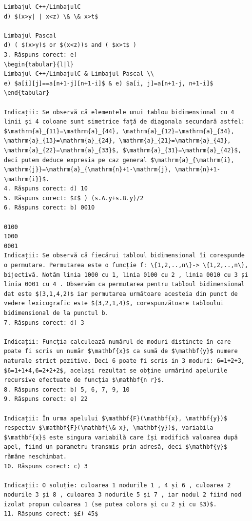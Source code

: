 \documentclass[10pt]{article}
\begin{document}
\begin{verbatim}
Limbajul C++/LimbajulC
d) $(x>y| | x<z) \& \& x>t$

Limbajul Pascal
d) ( $(x>y)$ or $(x<z))$ and ( $x>t$ )
3. Răspuns corect: e)
\begin{tabular}{l|l} 
Limbajul C++/LimbajulC & Limbajul Pascal \\
e) $a[i][j]==a[n+1-j][n+1-i]$ & e) $a[i, j]=a[n+1-j, n+1-i]$
\end{tabular}

Indicații: Se observă că elementele unui tablou bidimensional cu 4 linii și 4 coloane sunt simetrice față de diagonala secundară astfel: $\mathrm{a}_{11}=\mathrm{a}_{44}, \mathrm{a}_{12}=\mathrm{a}_{34}, \mathrm{a}_{13}=\mathrm{a}_{24}, \mathrm{a}_{21}=\mathrm{a}_{43}, \mathrm{a}_{22}=\mathrm{a}_{33}$, $\mathrm{a}_{31}=\mathrm{a}_{42}$, deci putem deduce expresia pe caz general $\mathrm{a}_{\mathrm{i}, \mathrm{j}}=\mathrm{a}_{\mathrm{n}+1-\mathrm{j}, \mathrm{n}+1-\mathrm{i}}$.
4. Răspuns corect: d) 10
5. Răspuns corect: $£$ ) (s.A.y+s.B.y)/2
6. Răspuns corect: b) 0010

0100
1000
0001
Indicații: Se observă că fiecărui tabloul bidimensional îi corespunde o permutare. Permutarea este o funcție f: \{1,2,..,n\}-> \{1,2,..,n\}, bijectivă. Notăm linia 1000 cu 1, linia 0100 cu 2 , linia 0010 cu 3 și linia 0001 cu 4 . Observăm ca permutarea pentru tabloul bidimensional dat este $(3,1,4,2)$ iar permutarea următoare acesteia din punct de vedere lexicografic este $(3,2,1,4)$, corespunzătoare tabloului bidimensional de la punctul b.
7. Răspuns corect: d) 3

Indicații: Funcția calculează numărul de moduri distincte în care poate fi scris un număr $\mathbf{x}$ ca sumă de $\mathbf{y}$ numere naturale strict pozitive. Deci 6 poate fi scris in 3 moduri: 6=1+2+3, $6=1+1+4,6=2+2+2$, același rezultat se obține urmărind apelurile recursive efectuate de funcția $\mathbf{n r}$.
8. Răspuns corect: b) 5, 6, 7, 9, 10
9. Răspuns corect: e) 22

Indicații: În urma apelului $\mathbf{F}(\mathbf{x}, \mathbf{y})$ respectiv $\mathbf{F}(\mathbf{\& x}, \mathbf{y})$, variabila $\mathbf{x}$ este singura variabilă care își modifică valoarea după apel, fiind un parametru transmis prin adresă, deci $\mathbf{y}$ rămâne neschimbat.
10. Răspuns corect: c) 3

Indicații: O soluție: culoarea 1 nodurile 1 , 4 și 6 , culoarea 2 nodurile 3 și 8 , culoarea 3 nodurile 5 și 7 , iar nodul 2 fiind nod izolat propun culoarea 1 (se putea colora și cu 2 și cu $3)$.
11. Răspuns corect: $£) 45$


\end{verbatim}
\end{document}
